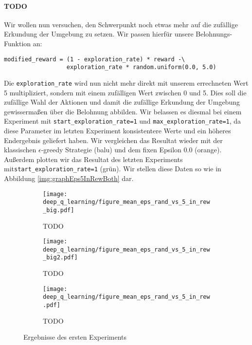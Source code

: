 \paragraph{TODO}
Wir wollen nun versuchen, den Schwerpunkt noch etwas mehr auf die zufällige Erkundung der Umgebung zu setzen. Wir passen hierfür unsere Belohnungs-Funktion an:
\begin{verbatim}
modified_reward = (1 - exploration_rate) * reward -\
                  exploration_rate * random.uniform(0.0, 5.0)
\end{verbatim}
Die \texttt{exploration_rate} wird nun nicht mehr direkt mit unserem errechneten Wert 5 multipliziert, sondern mit einem zufälligen Wert zwischen 0 und 5. Dies soll die zufällige Wahl der Aktionen und damit die zufällige Erkundung der Umgebung gewissermaßen über die Belohnung abbilden. Wir belassen es diesmal bei einem Experiment mit \texttt{start_exploration_rate=1} und \texttt{max_exploration_rate=1}, da diese Parameter im letzten Experiment konsistentere Werte und ein höheres Endergebnis geliefert haben. Wir vergleichen das Resultat wieder mit der klassischen $ \epsilon $-greedy Strategie (balu) und dem fixen Epsilon 0.0 (orange). Außerdem plotten wir das Resultat des letzten Experiments mit\linebreak\texttt{start_exploration_rate=1} (grün). Wir stellen diese Daten so wie in Abbildung \ref{img:graphEps5InRewBoth} dar.

\begin{figure}[h!]
    \centering
    \begin{subfigure}[b]{0.49\textwidth}
        \texttt{[image: deep\_q\_learning/figure\_mean\_eps\_rand\_vs\_5\_in\_rew\_big.pdf]}
        \caption{TODO}
        \label{img:graphEpsRandVs5InRewBig}
    \end{subfigure}
    \begin{subfigure}[b]{0.49\textwidth}
        \texttt{[image: deep\_q\_learning/figure\_mean\_eps\_rand\_vs\_5\_in\_rew\_big2.pdf]}
        \caption{TODO}
        \label{img:graphEpsRandVs5InRewBig2}
    \end{subfigure}
    \begin{subfigure}[b]{0.7\textwidth}
        \texttt{[image: deep\_q\_learning/figure\_mean\_eps\_rand\_vs\_5\_in\_rew.pdf]}
        \caption{TODO}
        \label{img:graphEpsRandVs5InRew}
    \end{subfigure}
    \caption{Ergebnisse des ersten Experiments}
    \label{img:graphEpsRandVs5InRewBoth}
\end{figure}

